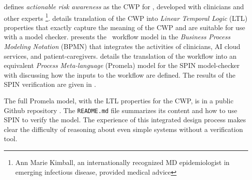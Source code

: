  defines \emph{actionable risk awareness} as the CWP for \phware, developed with clinicians and other experts \footnote{Ann Marie Kimball, an internationally recognized MD epidemiologist in emerging infectious disease, provided medical advice}.
 details translation of the CWP into \emph{Linear Temporal Logic} (LTL) \cite{10.5555/975331} properties that exactly capture the meaning of the CWP and are suitable for use with a model checker.
 presents the \phware\ workflow model in the \emph{Business Process Modeling Notation} (BPMN) \cite{BPMN} that integrates the activities of clinicians, AI cloud services, and patient-caregivers.
 details the translation of the workflow into an equivalent \emph{Process Meta-language} (Promela) model for the SPIN model-checker \cite{spin} with  discussing how the inputs to the workflow are defined.
The results of the SPIN verification are given in .

The full Promela model, with the LTL properties for the CWP, is in a public Github repository \cite{repo}.
The \texttt{README.md} file summarizes its content and how to use SPIN to verify the model. 
The experience of this integrated design process makes clear the difficulty of reasoning about even simple systems without a verification tool.


